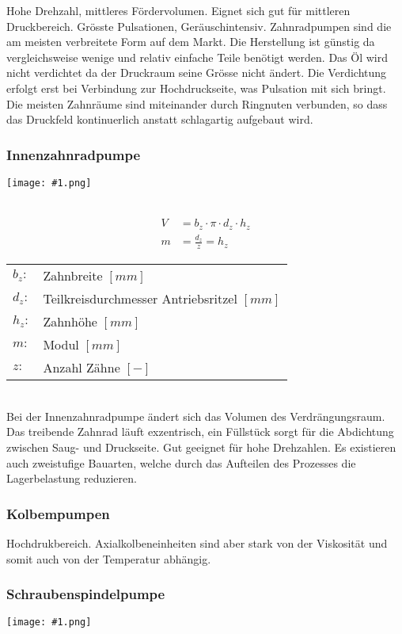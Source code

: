\documentclass[landscape,a4paper,10pt]{article}
\newcommand{\graphiccol}[1]{
\noindent
\begin{minipage}{\columnwidth}
\centering
\texttt{[image: \#1.png]}
\end{minipage}
\medskip \\
}
\begin{document}
\begin{multicols*}{3}
Hohe Drehzahl, mittleres Fördervolumen. Eignet sich gut für mittleren Druckbereich. Grösste Pulsationen, Geräuschintensiv. Zahnradpumpen sind die am meisten verbreitete Form auf dem Markt. Die Herstellung ist günstig da vergleichsweise wenige und relativ einfache Teile benötigt werden. Das Öl wird nicht verdichtet da der Druckraum seine Grösse nicht ändert. Die Verdichtung erfolgt erst bei Verbindung zur Hochdruckseite, was Pulsation mit sich bringt. Die meisten Zahnräume sind miteinander durch Ringnuten verbunden, so dass das Druckfeld kontinuerlich anstatt schlagartig aufgebaut wird. 


\subsubsection{Innenzahnradpumpe}
\graphiccol{innenzahnradpumpe}

\begin{align*}
V &= b_z \cdot \pi \cdot d_z \cdot h_z \\
m &= \frac{d_z}{z} = h_z
\end{align*}

\begin{tabular}{ll}
$b_z:$ & Zahnbreite $[mm]$\\
$d_z:$& Teilkreisdurchmesser Antriebsritzel $[mm]$\\
$h_z:$& Zahnhöhe $[mm]$\\
$m:$& Modul $[mm]$\\
$z:$& Anzahl Zähne $[-]$
\end{tabular} \\

Bei der Innenzahnradpumpe ändert sich das Volumen des Verdrängungsraum. Das treibende Zahnrad läuft exzentrisch, ein Füllstück sorgt für die Abdichtung zwischen Saug- und Druckseite. Gut geeignet für hohe Drehzahlen. Es existieren auch zweistufige Bauarten, welche durch das Aufteilen des Prozesses die Lagerbelastung reduzieren. 


\subsubsection{Kolbempumpen}
Hochdrukbereich. Axialkolbeneinheiten sind aber stark von der Viskosität und somit auch von der Temperatur abhängig. 



\subsubsection{Schraubenspindelpumpe}
\graphiccol{schraubenspindelpumpe}


\end{multicols*}
\end{document}
